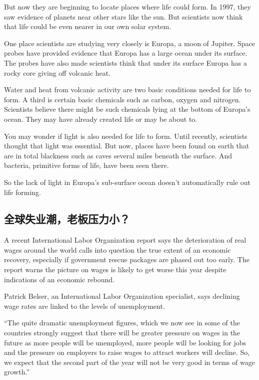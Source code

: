 But now they are beginning to locate places where life
could form. In 1997, they saw evidence of planets near
other stars like the sun. But scientists now think that life
could be even nearer in our own solar system.

One place scientists are studying very closely is Europa,
a moon of Jupiter. Space probes have provided
evidence that Europa has a large ocean under its surface.
The probes have also made scientists think that under its
surface Europa has a rocky core giving off volcanic heat.

Water and heat from volcanic activity are two basic
conditions needed for life to form. A third is certain basic
chemicals such as carbon, oxygen and nitrogen. Scientists
believe there might be such chemicals lying at the bottom
of Europa's ocean. They may have already created life or
may be about to.

You may wonder if light is also needed for life to form.
Until recently, scientists thought that light was essential.
But now, places have been found on earth that are in total
blackness such as caves several miles beneath the surface.
And bacteria, primitive forms of life, have been seen
there.

So the lack of light in Europa's sub-surface ocean doesn't
automatically rule out life forming.
\subsection{全球失业潮，老板压力小？}
\begin{margintable}\vspace{-2cm}\footnotesize
\end{margintable}
A recent International Labor Organization report says
the deterioration of real wages around the world calls into
question the true extent of an economic recovery, especially
if government rescue packages are phased out too
early. The report warns the picture on wages is likely to
get worse this year despite indications of an economic rebound.

Patrick Belser, an International Labor Organization specialist,
says declining wage rates are linked to the levels of
unemployment.

“The quite dramatic unemployment figures, which we now
see in some of the countries strongly suggest that there will
be greater pressure on wages in the future as more people
will be unemployed, more people will be looking
for jobs and the pressure on employers to raise wages to
attract workers will decline. So, we expect that the second
part of the year will not be very good in terms of wage
growth.”

